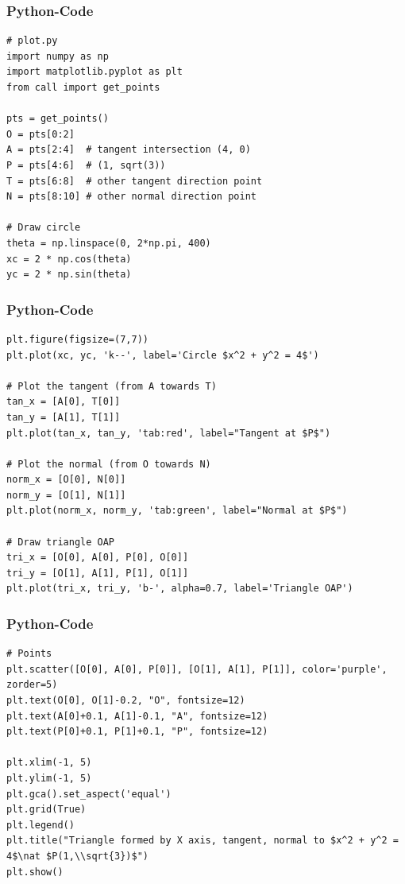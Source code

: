 \documentclass{beamer}
\begin{document}
\begin{frame}[fragile]
\frametitle{Python-Code}
\begin{lstlisting}
# plot.py
import numpy as np
import matplotlib.pyplot as plt
from call import get_points

pts = get_points()
O = pts[0:2]
A = pts[2:4]  # tangent intersection (4, 0)
P = pts[4:6]  # (1, sqrt(3))
T = pts[6:8]  # other tangent direction point
N = pts[8:10] # other normal direction point

# Draw circle
theta = np.linspace(0, 2*np.pi, 400)
xc = 2 * np.cos(theta)
yc = 2 * np.sin(theta)
\end{lstlisting}
\end{frame}

\begin{frame}[fragile]
\frametitle{Python-Code}
\begin{lstlisting}
plt.figure(figsize=(7,7))
plt.plot(xc, yc, 'k--', label='Circle $x^2 + y^2 = 4$')

# Plot the tangent (from A towards T)
tan_x = [A[0], T[0]]
tan_y = [A[1], T[1]]
plt.plot(tan_x, tan_y, 'tab:red', label="Tangent at $P$")

# Plot the normal (from O towards N)
norm_x = [O[0], N[0]]
norm_y = [O[1], N[1]]
plt.plot(norm_x, norm_y, 'tab:green', label="Normal at $P$")

# Draw triangle OAP
tri_x = [O[0], A[0], P[0], O[0]]
tri_y = [O[1], A[1], P[1], O[1]]
plt.plot(tri_x, tri_y, 'b-', alpha=0.7, label='Triangle OAP')
\end{lstlisting}
\end{frame}

\begin{frame}[fragile]
\frametitle{Python-Code}
\begin{lstlisting}
# Points
plt.scatter([O[0], A[0], P[0]], [O[1], A[1], P[1]], color='purple', zorder=5)
plt.text(O[0], O[1]-0.2, "O", fontsize=12)
plt.text(A[0]+0.1, A[1]-0.1, "A", fontsize=12)
plt.text(P[0]+0.1, P[1]+0.1, "P", fontsize=12)

plt.xlim(-1, 5)
plt.ylim(-1, 5)
plt.gca().set_aspect('equal')
plt.grid(True)
plt.legend()
plt.title("Triangle formed by X axis, tangent, normal to $x^2 + y^2 = 4$\nat $P(1,\\sqrt{3})$")
plt.show()
\end{lstlisting}
\end{frame}
\end{document}

